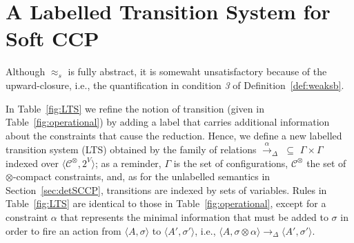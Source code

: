 \documentclass[main.tex]{subfiles}
\begin{document}
\section{A Labelled Transition System for Soft CCP}\label{sec:ltsSCCP}\label{sec:4}
Although $\approx_{\mathit{s}}$ is fully abstract, it is somewaht unsatisfactory
because of the upward-closure, i.e., the quantification in condition \emph{3} of Definition~\ref{def:weaksb}.

In Table~\ref{fig:LTS} we refine the notion of transition (given in Table~\ref{fig:operational})
by adding a label that carries additional information about the constraints that cause the reduction.
Hence, we define a new labelled transition system (LTS) obtained by the family of relations
$\xrightarrow{\;  \alpha \;}_\Delta \, \, \subseteq \, \,\Gamma \times \Gamma$ indexed over 
$\langle \mathcal{C}^\otimes, 2^V \rangle$;
as a reminder, $\Gamma$ is the set of configurations, $\mathcal{C}^\otimes$ the set of $\otimes$-compact constraints, and,  as for the unlabelled semantics in Section~\ref{sec:detSCCP}, 
transitions are indexed by sets of variables.
Rules in Table~\ref{fig:LTS} are identical to those in Table~\ref{fig:operational}, except for a constraint $\alpha$ that
represents the minimal information that must be added to $\sigma$ in order to fire an action
from $\langle A, \sigma\rangle$  to $\langle A', \sigma' \rangle$, i.e., $\langle A, \sigma \otimes \alpha\rangle \longrightarrow_\Delta \langle A' , \sigma' \rangle$.


\end{document}

